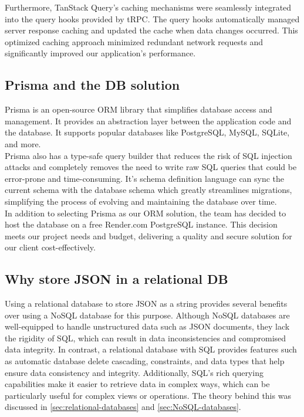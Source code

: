 \noindent
Furthermore, TanStack Query's caching mechanisms were seamlessly integrated into the query hooks provided by tRPC. The query hooks automatically managed server response caching and updated the cache when data changes occurred. This optimized caching approach minimized redundant network requests and significantly improved our application's performance.

\subsection{Prisma and the DB solution}

Prisma is an open-source ORM library that simplifies database access and management. It provides an abstraction layer between the application code and the database. It supports popular databases like PostgreSQL, MySQL, SQLite, and more. \\

\noindent
Prisma also has a type-safe query builder that reduces the risk of SQL injection attacks and completely removes the need to write raw SQL queries that could be error-prone and time-consuming. It's schema definition language can sync the current schema with the database schema which greatly streamlines migrations, simplifying the process of evolving and maintaining the database over time. \cite{prisma2022migrate} \\

\noindent
In addition to selecting Prisma as our ORM solution, the team has decided to host the database on a free Render.com PostgreSQL instance. This decision meets our project needs and budget, delivering a quality and secure solution for our client cost-effectively. \cite{render2022pricing}

\subsection{Why store JSON in a relational DB}

Using a relational database to store JSON as a string provides several benefits over using a NoSQL database for this purpose. \cite{Microsoft_JSON_DB_storage} Although NoSQL databases are well-equipped to handle unstructured data such as JSON documents, they lack the rigidity of SQL, which can result in data inconsistencies and compromised data integrity. In contrast, a relational database with SQL provides features such as automatic database delete cascading, constraints, and data types that help ensure data consistency and integrity. Additionally, SQL's rich querying capabilities make it easier to retrieve data in complex ways, which can be particularly useful for complex views or operations. The theory behind this was discussed in \autoref{sec:relational-databases} and \autoref{sec:NoSQL-databases}. 

